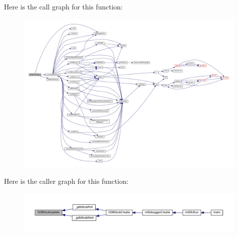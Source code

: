 Here is the call graph for this function\+:
\nopagebreak
\begin{figure}[H]
\begin{center}
\leavevmode
\includegraphics[width=350pt]{gdb-stub_8c_a258a1ad74baac2ecfadeab0d1e07e3b0_cgraph}
\end{center}
\end{figure}
Here is the caller graph for this function\+:
\nopagebreak
\begin{figure}[H]
\begin{center}
\leavevmode
\includegraphics[width=350pt]{gdb-stub_8c_a258a1ad74baac2ecfadeab0d1e07e3b0_icgraph}
\end{center}
\end{figure}
